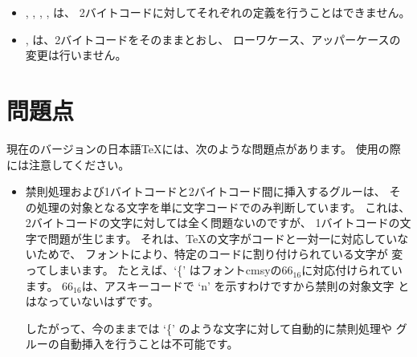\begin{itemize}
\item {}, , , ,
	は、
	2バイトコードに対してそれぞれの定義を行うことはできません。
\item {}, は、2バイトコードをそのままとおし、
	ローワケース、アッパーケースの変更は行いません。
\end{itemize}


\section{問題点}
現在のバージョンの日本語\TeX には、次のような問題点があります。
使用の際には注意してください。

\begin{itemize}
\item 禁則処理および1バイトコードと2バイトコード間に挿入するグルーは、
	その処理の対象となる文字を単に文字コードでのみ判断しています。
	これは、2バイトコードの文字に対しては全く問題ないのですが、
	1バイトコードの文字で問題が生じます。
	それは、\TeX の文字がコードと一対一に対応していないためで、
	フォントにより、特定のコードに割り付けられている文字が
	変ってしまいます。
	たとえば、`\{' はフォントcmsyの66$_{16}$に対応付けられています。
	66$_{16}$は、アスキーコードで `n' を示すわけですから禁則の対象文字
	とはなっていないはずです。

	したがって、今のままでは `\{' のような文字に対して自動的に禁則処理や
	グルーの自動挿入を行うことは不可能です。
\end{itemize}

